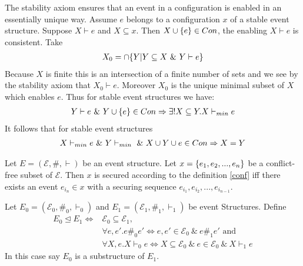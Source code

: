 \documentclass{article}
\begin{document}
The stability axiom ensures that an event in a configuration is
enabled in an essentially unique way.
Assume $e$ belongs to a configuration $x$ of a stable event structure.
Suppose $X \vdash e$ and $X \subseteq x$.
Then $X \cup \{e\} \in Con$, the enabling $X\vdash e$ is consistent.
Take
\begin{align*}
    X_0 = \cap \{Y | Y \subseteq X \ \& \  Y \vdash e\}
\end{align*}
Because $X$ is finite this is an intersection of a finite number of
sets and we see by the stability axiom that $X_0 \vdash e$.
Moreover $X_0$ is the unique minimal subset of $X$ which enables $e$.
Thus for stable event structures we have:
\begin{align*}
    Y \vdash e \ \& \  Y \cup \{e\} \in Con \Rightarrow
    \exists ! X \subseteq Y.X \vdash_{min} e
\end{align*}
It follows that for stable event structures
\begin{align*}
    X \vdash_{min} e \ \& \  Y \vdash_{min} \ \& \ 
    X \cup Y \cup e \in Con \Rightarrow X = Y
\end{align*}

\begin{theorem}
    Let $E = (\mathcal{E}, \#, \vdash)$ be an event structure.
    Let $x = \{e_1,e_2,...,e_n\}$ be a conflict-free subset of $\mathcal{E}$.
    Then $x$ is secured according to the definition \ref{conf} iff
    there exists an event $e_{i_n} \in x$ with a securing sequence $e_{i_1},e_{i_2},...,e_{i_{n-1}}$.

\end{theorem}

\begin{definition}
    Let $E_0 = (\mathcal{E}_0,\#_0,\vdash_0)$ and $E_1 = (\mathcal{E}_1,\#_1,\vdash_1)$
    be event Structures. Define
    \begin{align*}
        E_0 \trianglelefteq E_1 \iff & \mathcal{E}_0 \subseteq \mathcal{E}_1,                                          \\
                                     & \forall e,e'. e\#_0e'  \iff e,e' \in \mathcal{E}_0 \ \& \ e\#_1 e' \text{ and } \\
                                     & \forall X,e.X\vdash_0 e  \iff X \subseteq \mathcal{E}_0
        \ \& \ e \in \mathcal{E}_0\ \& \ X \vdash_1 e
    \end{align*}
    In this case say $E_0$ is a substructure of $E_1$.
\end{definition}
\end{document}
